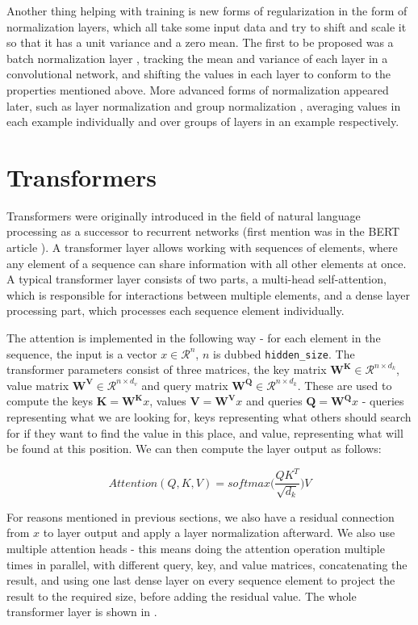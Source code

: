 Another thing helping with training is new forms of regularization in the form of normalization layers, which all take some input data and try to shift and scale it so that it has a unit variance and a zero mean. The first to be proposed was a batch normalization layer \citep{batch_norm}, tracking the mean and variance of each layer in a convolutional network, and shifting the values in each layer to conform to the properties mentioned above. More advanced forms of normalization appeared later, such as layer normalization \citep{layer_norm} and group normalization \citep{group_norm}, averaging values in each example individually and over groups of layers in an example respectively.


\section{Transformers}

Transformers were originally introduced in the field of natural language processing as a successor to recurrent networks (first mention was in the BERT article \citep{BERT}). A transformer layer allows working with sequences of elements, where any element of a sequence can share information with all other elements at once. A typical transformer layer consists of two parts, a multi-head self-attention, which is responsible for interactions between multiple elements, and a dense layer processing part, which processes each sequence element individually.

The attention is implemented in the following way - for each element in the sequence, the input is a vector $x \in \mathcal{R}^n$, $n$ is dubbed \texttt{hidden\_size}. The transformer parameters consist of three matrices, the key matrix $\mathbf{W^K} \in \mathcal{R}^{n \times d_k}$, value matrix $\mathbf{W^V} \in \mathcal{R}^{n \times d_v}$ and query matrix $\mathbf{W^Q} \in \mathcal{R}^{n \times d_k}$. These are used to compute the keys $\mathbf{K}=\mathbf{W^K}x$, values $\mathbf{V}=\mathbf{W^V}x$ and queries $\mathbf{Q}=\mathbf{W^Q}x$ - queries representing what we are looking for, keys representing what others should search for if they want to find the value in this place, and value, representing what will be found at this position. We can then compute the layer output as follows:

$$Attention(Q, K, V) = softmax \biggl( \frac{QK^T}{\sqrt{d_k}} \biggl) V$$

For reasons mentioned in previous sections, we also have a residual connection from $x$ to layer output and apply a layer normalization afterward. We also use multiple attention heads - this means doing the attention operation multiple times in parallel, with different query, key, and value matrices, concatenating the result, and using one last dense layer on every sequence element to project the result to the required size, before adding the residual value. The whole transformer layer is shown in .

